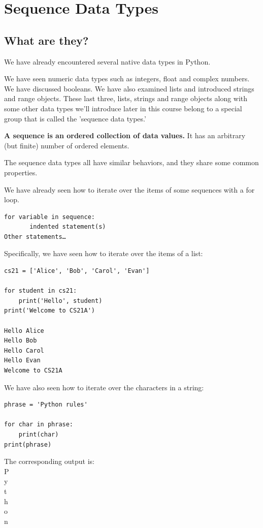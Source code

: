 \documentclass{article}
\begin{document}
\section{Sequence Data Types}
\subsection{What are they?}
We have already encountered several native data types in Python.  

We have seen numeric data types such as integers, float and complex numbers.  We have discussed booleans.   We have also examined lists and introduced strings and range objects.  These last three, lists, strings and range objects along with some other data types we'll introduce later in this course belong to a special group that is called the 'sequence data types.'

\textbf{A sequence is an ordered collection of data values.}   It has an arbitrary (but finite) number of ordered elements.

The sequence data types all have similar behaviors, and they share some common properties.

We have already seen how to iterate over the items of some sequences with a for loop. 

\begin{lstlisting}
for variable in sequence:
       indented statement(s) 
Other statements…
\end{lstlisting}

Specifically, we have seen how to iterate over the items of a list:

\begin{lstlisting}
cs21 = ['Alice', 'Bob', 'Carol', 'Evan']

for student in cs21:
    print('Hello', student)
print('Welcome to CS21A')
 
Hello Alice
Hello Bob
Hello Carol
Hello Evan
Welcome to CS21A
\end{lstlisting}

We have also seen how to iterate over the characters in a string:

\begin{lstlisting}
phrase = 'Python rules'

for char in phrase:
    print(char)
print(phrase)
\end{lstlisting}

The corresponding output is:\\
 
P\\
y\\
t\\
h\\
o\\
n\\
 
\end{document}
